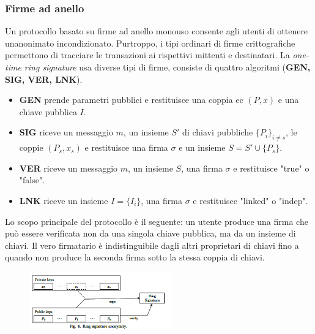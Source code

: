 \subsubsection{Firme ad anello}\label{firme-ad-anello}

Un protocollo basato su firme ad anello monouso consente agli utenti di
ottenere un\textquotesingle anonimato incondizionato. Purtroppo, i tipi
ordinari di firme crittografiche permettono di tracciare le transazioni
ai rispettivi mittenti e destinatari. La \emph{one-time ring signature}
usa diverse tipi di firme, consiste di quattro algoritmi (\textbf{GEN,
SIG, VER, LNK}).

\begin{itemize}
  \item
    \textbf{GEN} prende parametri pubblici e restituisce una coppia ec
    \emph{$(P, x)$} e una chiave pubblica $I$.
  \item
    \textbf{SIG} riceve un messaggio $m$, un insieme $S'$ di chiavi pubbliche
    $\{P_i\}_{i \neq s}$, le coppie \emph{$(P_s, x_s)$} e restituisce una firma $\sigma$ e un
    insieme $S = S' \cup \{P_s\}$.
  \item
    \textbf{VER} riceve un messaggio $m$, un insieme $S$, una firma $\sigma$ e
    restituisce "true" o "false".
  \item
    \textbf{LNK} riceve un insieme $I = \{I_i\}$, una firma $\sigma$ e restituisce
    "linked" o "indep".
\end{itemize}

Lo scopo principale del protocollo è il seguente: un utente produce una
firma che può essere verificata non da una singola chiave pubblica, ma
da un insieme di chiavi. Il vero firmatario è indistinguibile dagli
altri proprietari di chiavi fino a quando non produce la seconda firma
sotto la stessa coppia di chiavi.

\begin{figure}[h]
  \centering
  \includegraphics[width = 0.55\textwidth]{image5.png}
\end{figure}

